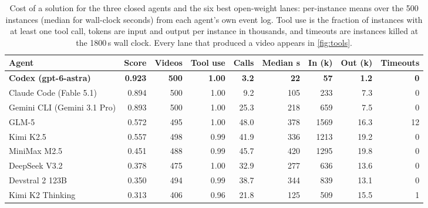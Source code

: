 \begin{table}[!htb]
\centering
\caption{Cost of a solution for the three closed agents and the six best open-weight lanes: per-instance means over the 500 instances (median for wall-clock seconds) from each agent's own event log. Tool use is the fraction of instances with at least one tool call, tokens are input and output per instance in thousands, and timeouts are instances killed at the 1800\,s wall clock. Every lane that produced a video appears in \cref{fig:tools}.}
\label{tab:efficiency}
\small
\setlength{\tabcolsep}{4pt}
\begin{tabular}{lrrrrrrrr}
\toprule
Agent & Score & Videos & Tool use & Calls & Median s & In (k) & Out (k) & Timeouts \\
\midrule
\textbf{Codex (gpt-6-astra)} & \textbf{0.923} & \textbf{500} & \textbf{1.00} & \textbf{3.2} & \textbf{22} & \textbf{57} & \textbf{1.2} & \textbf{0} \\
Claude Code (Fable 5.1) & 0.894 & 500 & 1.00 & 9.2 & 105 & 233 & 7.3 & 0 \\
Gemini CLI (Gemini 3.1 Pro) & 0.893 & 500 & 1.00 & 25.3 & 218 & 659 & 7.5 & 0 \\
\midrule
GLM-5 & 0.572 & 495 & 1.00 & 48.0 & 378 & 1569 & 16.3 & 12 \\
Kimi K2.5 & 0.557 & 498 & 0.99 & 41.9 & 336 & 1213 & 19.2 & 0 \\
MiniMax M2.5 & 0.451 & 488 & 0.99 & 45.7 & 420 & 1295 & 19.8 & 0 \\
DeepSeek V3.2 & 0.378 & 475 & 1.00 & 32.9 & 277 & 636 & 13.6 & 0 \\
Devstral 2 123B & 0.350 & 494 & 0.99 & 38.7 & 344 & 839 & 13.1 & 0 \\
Kimi K2 Thinking & 0.313 & 406 & 0.96 & 21.8 & 125 & 509 & 15.5 & 1 \\
\bottomrule
\end{tabular}
\end{table}
